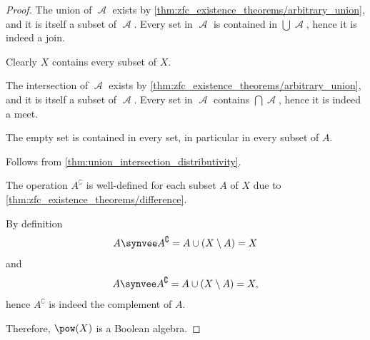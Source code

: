 \begin{proof}
   The union of \( \mscrA \) exists by \cref{thm:zfc_existence_theorems/arbitrary_union}, and it is itself a subset of \( \mscrA \). Every set in \( \mscrA \) is contained in \( \bigcup \mscrA \), hence it is indeed a join.

   Clearly \( X \) contains every subset of \( X \).

   The intersection of \( \mscrA \) exists by \cref{thm:zfc_existence_theorems/arbitrary_union}, and it is itself a subset of \( \mscrA \). Every set in \( \mscrA \) contains \( \bigcap \mscrA \), hence it is indeed a meet.

   The empty set is contained in every set, in particular in every subset of \( A \).

   Follows from \cref{thm:union_intersection_distributivity}.

   The operation \( A^\complement \) is well-defined for each subset \( A \) of \( X \) due to \cref{thm:zfc_existence_theorems/difference}.

  By definition
  \begin{equation*}
    A \synvee A^\complement
    =
    A \cup (X \setminus A)
    =
    X
  \end{equation*}
  and
  \begin{equation*}
    A \synvee A^\complement
    =
    A \cup (X \setminus A)
    =
    X,
  \end{equation*}
  hence \( A^\complement \) is indeed the complement of \( A \).

  Therefore, \( \pow(X) \) is a Boolean algebra.
\end{proof}

